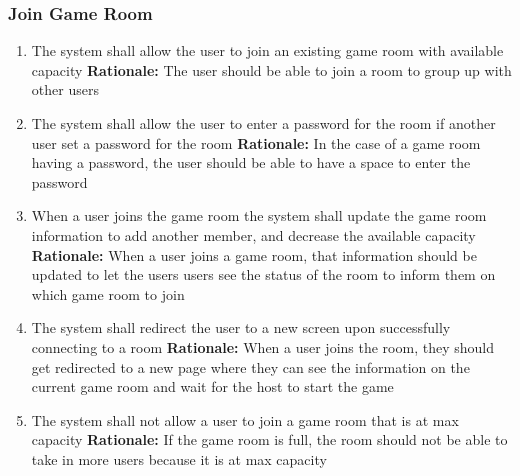 \documentclass[12pt]{article}
\begin{document}
\subsubsection{Join Game Room}
\begin{enumerate}[label=JG\arabic*., series=JoinGame]
	\item The system shall allow the user to join an existing game room with available capacity \newline 
    \textbf{Rationale:} The user should be able to join a room to group up with other users 
    \item The system shall allow the user to enter a password for the room if another user set a password for the room \newline 
    \textbf{Rationale:} In the case of a game room having a password, the user should be able to have a space to enter the password
    \item When a user joins the game room the system shall update the game room information to add another member, and decrease the available capacity\newline 
    \textbf{Rationale:} When a user joins a game room, that information should be updated to let the users users see the status of the room to inform them on which game room to join
    \item The system shall redirect the user to a new screen upon successfully connecting to a room\newline 
    \textbf{Rationale:} When a user joins the room, they should get redirected to a new page where they can see the information on the current game room and wait for the host to start the game
    \item The system shall not allow a user to join a game room that is at max capacity\newline
    \textbf{Rationale:} If the game room is full, the room should not be able to take in more users because it is at max capacity
\end{enumerate}
\end{document}

